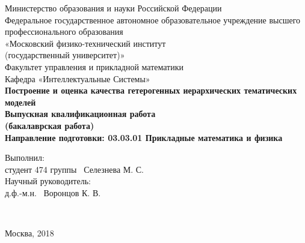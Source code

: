 \begin{titlepage}
{
\renewcommand{\baselinestretch}{1}
\thispagestyle{empty}
\begin{center}
    \sc
        Министерство образования и науки Российской Федерации\\
        \bigskip
        Федеральное государственное автономное образовательное учреждение высшего профессионального образования \\
        «Московский физико-технический институт \\
{\rm(государственный университет)}»\\
		\bigskip
        Факультет управления и прикладной математики\\
        \bigskip
        Кафедра «Интеллектуальные Системы»\\[35mm]
    \bf\Large
        Построение и оценка качества гетерогенных иерархических
		тематических моделей \\[5mm]
    \bigskip
    \rm\normalsize
    	Выпускная квалификационная работа\\
    	 (бакалаврская работа)\\
  	\bigskip
    \rm\normalsize
       Направление подготовки: 03.03.01 Прикладные математика и физика\\[10mm]
        
       \begin{flushleft}
       Выполнил:\\
студент 474 группы \underline{\hspace{2.5in}} \, Селезнева М. С.\\[5mm]


Научный руководитель:\\
д.ф.-м.н.\underline{\hspace{3.5in}} \, Воронцов К. В.\\[35mm]

		\end{flushleft}
\end{center}

\


\begin{center}
    Москва, 2018
\end{center}
}
\end{titlepage}
